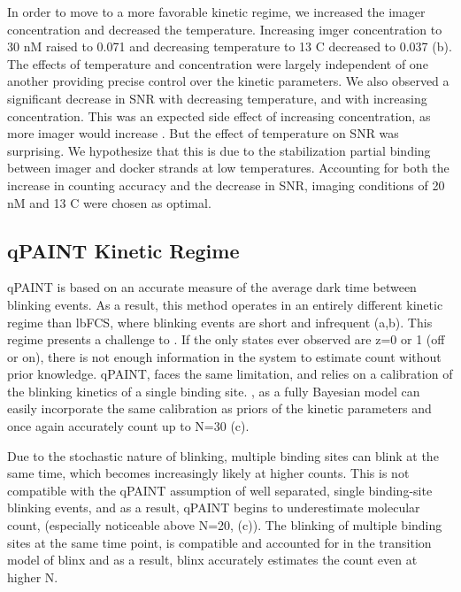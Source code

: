 In order to move to a more favorable kinetic regime, 
we increased the imager concentration and decreased the temperature.
	Increasing imger concentration to 30 nM raised \pon to 0.071 and 
	decreasing temperature to 13 C decreased \poff to 0.037 
	(b).
	The effects of temperature and concentration were largely independent 
	of one another providing precise control over the kinetic parameters. %
	We also observed a significant decrease in SNR with decreasing temperature, 
	and with increasing concentration. 
	This was an expected side effect of increasing concentration, as more imager would increase \rb.
	But the effect of temperature on SNR was surprising. 
	We hypothesize that this is due to the stabilization partial 
	binding between imager and docker strands at low temperatures.
	Accounting for both the increase in counting accuracy and the decrease 
	in SNR, imaging conditions of 20 nM and 13 C were chosen as optimal.

\subsection{qPAINT Kinetic Regime}
qPAINT is based on an accurate measure of the average dark time between blinking events. 
	As a result, this method operates in an entirely different kinetic regime than lbFCS, where blinking 
	events are short and infrequent (a,b).
	This regime presents a challenge to \ours. 
	If the only states ever observed are z=0 or 1 (off or on), there is not enough information in the system to estimate count without prior knowledge.
	qPAINT, faces the same limitation, and relies on a calibration of the blinking kinetics of a single binding site.
	\ours, as a fully Bayesian model can easily incorporate the same calibration as priors of the kinetic parameters
	and once again accurately count up to N=30 (c).

Due to the stochastic nature of blinking, multiple binding sites can blink at the same time, which becomes increasingly likely at higher counts.
	This is not compatible with the qPAINT assumption of well separated, single binding-site blinking events, 
	and as a result, qPAINT begins to underestimate molecular count, (especially noticeable above N=20, (c)). 
	The blinking of multiple binding sites at the same time point, 
	is compatible and accounted for in the transition model of blinx 
	and as a result, blinx accurately estimates the count even at higher N.
	

